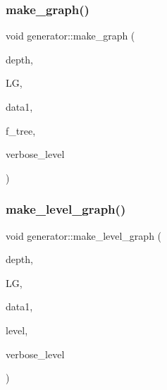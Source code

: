 \mbox{\label{classgenerator_a70dd7819a500c8baef63327eb5d72f4c}} 
\subsubsection{\texorpdfstring{make\+\_\+graph()}{make\_graph()}}
{\footnotesize\ttfamily void generator\+::make\+\_\+graph (\begin{DoxyParamCaption}\item[{\mbox{\hyperlink{galois_8h_a09fddde158a3a20bd2dcadb609de11dc}{I\+NT}}}]{depth,  }\item[{\mbox{\hyperlink{classlayered__graph}{layered\+\_\+graph}} $\ast$\&}]{LG,  }\item[{\mbox{\hyperlink{galois_8h_a09fddde158a3a20bd2dcadb609de11dc}{I\+NT}}}]{data1,  }\item[{\mbox{\hyperlink{galois_8h_a09fddde158a3a20bd2dcadb609de11dc}{I\+NT}}}]{f\+\_\+tree,  }\item[{\mbox{\hyperlink{galois_8h_a09fddde158a3a20bd2dcadb609de11dc}{I\+NT}}}]{verbose\+\_\+level }\end{DoxyParamCaption})}

\mbox{\label{classgenerator_ac5980214ff3f3db0a36011316869c712}} 
\subsubsection{\texorpdfstring{make\+\_\+level\+\_\+graph()}{make\_level\_graph()}}
{\footnotesize\ttfamily void generator\+::make\+\_\+level\+\_\+graph (\begin{DoxyParamCaption}\item[{\mbox{\hyperlink{galois_8h_a09fddde158a3a20bd2dcadb609de11dc}{I\+NT}}}]{depth,  }\item[{\mbox{\hyperlink{classlayered__graph}{layered\+\_\+graph}} $\ast$\&}]{LG,  }\item[{\mbox{\hyperlink{galois_8h_a09fddde158a3a20bd2dcadb609de11dc}{I\+NT}}}]{data1,  }\item[{\mbox{\hyperlink{galois_8h_a09fddde158a3a20bd2dcadb609de11dc}{I\+NT}}}]{level,  }\item[{\mbox{\hyperlink{galois_8h_a09fddde158a3a20bd2dcadb609de11dc}{I\+NT}}}]{verbose\+\_\+level }\end{DoxyParamCaption})}

